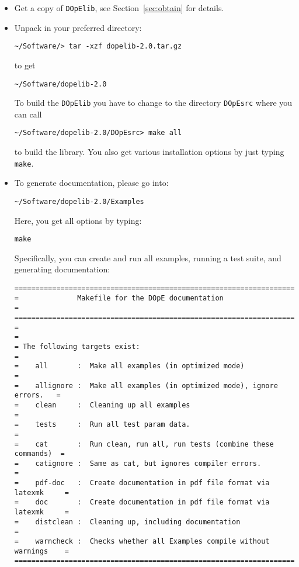 \begin{itemize}
%
\item Get a copy of \texttt{DOpElib}, see Section~\ref{sec:obtain} for details.
%
\item Unpack in your preferred directory:
\begin{lstlisting}
~/Software/> tar -xzf dopelib-2.0.tar.gz
\end{lstlisting}
to get
\begin{lstlisting}
~/Software/dopelib-2.0
\end{lstlisting}
To build the \texttt{DOpElib} you have to change to the directory 
\texttt{DOpEsrc} where you can call 
\begin{lstlisting}
~/Software/dopelib-2.0/DOpEsrc> make all
\end{lstlisting}
to build the library. You also get various installation options by just typing 
\texttt{make}.
\item To generate documentation, please go into:
\begin{lstlisting}
~/Software/dopelib-2.0/Examples
\end{lstlisting}
Here, you get all options by typing:
\begin{lstlisting}
make
\end{lstlisting}
Specifically, you can create and run all examples, running a test suite,
and generating documentation:
{\footnotesize
\begin{lstlisting}
===========================================================================
=              Makefile for the DOpE documentation                        =
===========================================================================
=                                                                         =
= The following targets exist:                                            =
=    all       :  Make all examples (in optimized mode)                   =
=    allignore :  Make all examples (in optimized mode), ignore errors.   =
=    clean     :  Cleaning up all examples                                =
=    tests     :  Run all test param data.                                =
=    cat       :  Run clean, run all, run tests (combine these commands)  =
=    catignore :  Same as cat, but ignores compiler errors.               =
=    pdf-doc   :  Create documentation in pdf file format via latexmk     =
=    doc       :  Create documentation in pdf file format via latexmk     =
=    distclean :  Cleaning up, including documentation                    =
=    warncheck :  Checks whether all Examples compile without warnings    =
===========================================================================

\end{lstlisting}}
\end{itemize}
